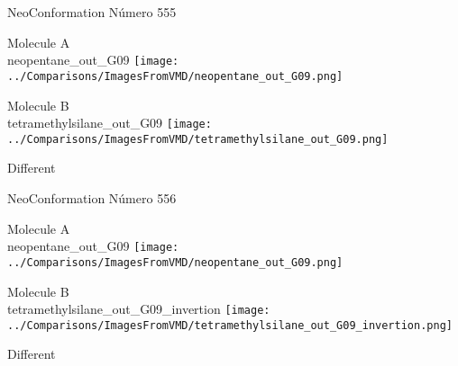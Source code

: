 \vtab[-3cm]
\begin{center}
{\large NeoConformation \tab Número 555}
\end{center}
\begin{multicols}{2}
\begin{center}
Molecule A \\ 
neopentane\_out\_G09
\texttt{[image: ../Comparisons/ImagesFromVMD/neopentane\_out\_G09.png]}
\\
\vtab

\columnbreak
Molecule B \\ 
tetramethylsilane\_out\_G09
\texttt{[image: ../Comparisons/ImagesFromVMD/tetramethylsilane\_out\_G09.png]}
\\
\vtab


\end{center}
\end{multicols}
\begin{center}
\textcolor{NavyBlue}{\Large Different}
\end{center}

 \newpage

\vtab[-3cm]
\begin{center}
{\large NeoConformation \tab Número 556}
\end{center}
\begin{multicols}{2}
\begin{center}
Molecule A \\ 
neopentane\_out\_G09
\texttt{[image: ../Comparisons/ImagesFromVMD/neopentane\_out\_G09.png]}
\\
\vtab

\columnbreak
Molecule B \\ 
tetramethylsilane\_out\_G09\_invertion
\texttt{[image: ../Comparisons/ImagesFromVMD/tetramethylsilane\_out\_G09\_invertion.png]}
\\
\vtab


\end{center}
\end{multicols}
\begin{center}
\textcolor{NavyBlue}{\Large Different}
\end{center}

 \newpage

